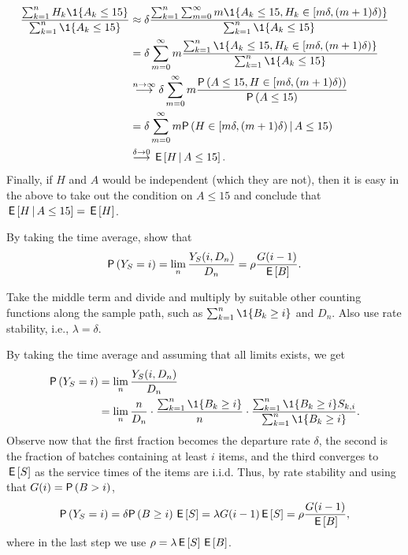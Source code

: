 \begin{exercise}
\begin{solution}
\begin{align*}
\frac{ \sum_{k=1}^n H_k \1{A_k\leq 15}}{\sum_{k=1}^n \1{A_k \leq 15}} 
&\approx
\delta \frac{ \sum_{k=1}^n  \sum_{m=0}^\infty m \1{A_k\leq 15, H_k \in [m\delta, (m+1)\delta)}}{\sum_{k=1}^n \1{A_k \leq 15}}  \\
&= \delta \sum_{m=0}^\infty m \frac{ \sum_{k=1}^n   \1{A_k\leq 15, H_k \in [m\delta, (m+1)\delta)}}{\sum_{k=1}^n \1{A_k \leq 15}}  \\
&\stackrel{n\to\infty}{\longrightarrow} \delta \sum_{m=0}^\infty m \frac{ \P{{A\leq 15, H \in [m\delta, (m+1)\delta)}}}{\P{A \leq 15}}  \\
&=\delta \sum_{m=0}^\infty m \P{H \in [m\delta, (m+1)\delta)\given A \leq 15} \\
&\stackrel{\delta\to0}{\longrightarrow}  \E{H\given A \leq 15}.
\end{align*}
Finally, if $H$ and $A$ would be independent (which they are not), then it is easy  in the above to take out the condition on $A\leq 15$ and conclude that $\,\mathsf{E}\left[H\,\middle|\, A\leq 15\right] = \,\mathsf{E}\left[H\right]$. 
\end{solution}
\end{exercise}


\begin{exercise}
By taking the time average, show that
\begin{equation*}
\P{Y_S=i} =\lim_n  \frac{Y_S(i, D_n)}{D_n} = \rho \frac{G(i-1)}{\E B}.
\end{equation*}
\begin{hint}
  Take the middle term and divide and multiply by suitable other counting functions along the sample path, such as $\sum_{k=1}^n \1{B_k \geq i}$ and $D_n$. Also use rate stability, i.e., $\lambda=\delta$. 
\end{hint}
  \begin{solution}
By taking the time average and assuming that all limits exists, we get
\begin{equation*}
  \begin{split}
\P{Y_S=i} &=\lim_n  \frac{Y_S(i, D_n)}{D_n} \\
&= \lim_n \frac{n}{D_n} \cdot \frac{\sum_{k=1}^n \1{B_k\geq i}}n \cdot
\frac{\sum_{k=1}^n \1{B_k\geq i} S_{k,i}}{\sum_{k=1}^n \1{B_k\geq i}}.
  \end{split}
\end{equation*}
Observe now that the first fraction becomes the departure rate $\delta$, the second is the fraction of batches containing at least $i$ items, and the third converges to $\,\mathsf{E}\left[S\right]$ as the service times of  the items are i.i.d.  Thus, by rate stability and using that $G(i)=\P{B>i}$, 
\begin{equation*}
\P{Y_S=i} = \delta \P{B\geq i} \E S = \lambda G(i-1) \E S = \rho \frac{G(i-1)}{\E B},
\end{equation*}
where in the last step we use $\rho=\lambda \,\mathsf{E}\left[S\right] \,\mathsf{E}\left[B\right]$.
  \end{solution}
\end{exercise}


